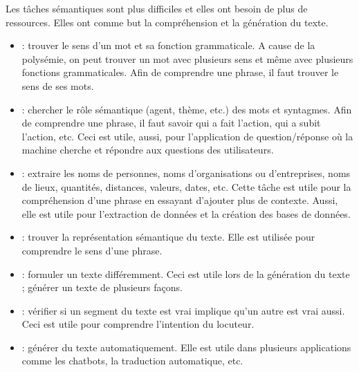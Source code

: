 \documentclass{KodeBook}
\begin{document}
Les tâches sémantiques sont plus difficiles et elles ont besoin de plus de ressources. 
Elles ont comme but la compréhension et la génération du texte. 
\begin{itemize}
	\item {} : trouver le sens d'un mot et sa fonction grammaticale. 
	A cause de la polysémie, on peut trouver un mot avec plusieurs sens et même avec plusieurs fonctions grammaticales. 
	Afin de comprendre une phrase, il faut trouver le sens de ses mots.
	\item {} : chercher le rôle sémantique (agent, thème, etc.) des mots et syntagmes.
	Afin de comprendre une phrase, il faut savoir qui a fait l'action, qui a subit l'action, etc. 
	Ceci est utile, aussi, pour l'application de question/réponse où la machine cherche et répondre aux questions des utilisateurs.
	\item {} : extraire les noms de personnes, noms d'organisations ou d'entreprises, noms de lieux, quantités, distances, valeurs, dates, etc. 
	Cette tâche est utile pour la compréhension d'une phrase en essayant d'ajouter plus de contexte. 
	Aussi, elle est utile pour l'extraction de données et la création des bases de données.
	\item {} : trouver la représentation sémantique du texte. 
	Elle est utilisée pour comprendre le sens d'une phrase.
	\item {} : formuler un texte différemment. 
	Ceci est utile lors de la génération du texte ; générer un texte de plusieurs façons.
	\item {} : vérifier si un segment du texte est vrai implique qu'un autre est vrai aussi.
	Ceci est utile pour comprendre l'intention du locuteur.
	\item {} : générer du texte automatiquement. 
	Elle est utile dans plusieurs applications comme les chatbots, la traduction automatique, etc.
\end{itemize}
\end{document}
